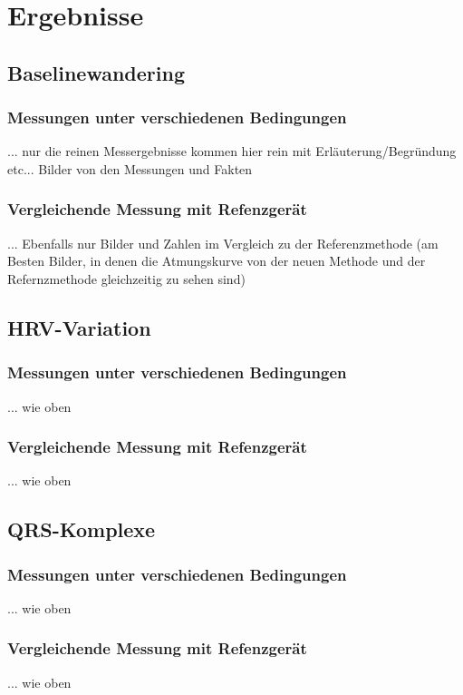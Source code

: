 


\chapter{Ergebnisse}
\section{Baselinewandering}
\subsection{Messungen unter verschiedenen Bedingungen}
... nur die reinen Messergebnisse kommen hier rein mit Erläuterung/Begründung etc...
Bilder von den Messungen und Fakten

\subsection{Vergleichende Messung mit Refenzgerät}
... Ebenfalls nur Bilder und Zahlen im Vergleich zu der Referenzmethode (am Besten Bilder, in denen die Atmungskurve von der neuen Methode und der Refernzmethode gleichzeitig zu sehen sind)

\section{HRV-Variation}
\subsection{Messungen unter verschiedenen Bedingungen}
... wie oben
\subsection{Vergleichende Messung mit Refenzgerät}
... wie oben

\section{QRS-Komplexe}
\subsection{Messungen unter verschiedenen Bedingungen}
... wie oben
\subsection{Vergleichende Messung mit Refenzgerät}
... wie oben


